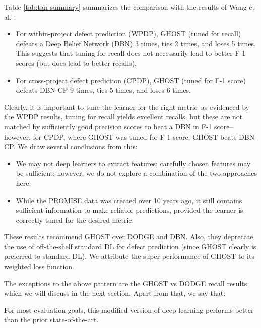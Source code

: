 \documentclass[10pt,compsoc,twocolumn]{IEEEtran}
\newcommand{\bi}{\begin{itemize}}
\newcommand{\ei}{\end{itemize}}
\begin{document}
Table \ref{tab:tan-summary} summarizes the comparison with the results of Wang et al. \cite{wang2016automatically}.
\bi
    \item For within-project defect prediction (WPDP), GHOST (tuned for recall) defeats a Deep Belief Network (DBN) 3 times, ties 2 times, and loses 5 times. This suggests that tuning for recall does not necessarily lead to better F-1 scores (but does lead to better recalls).
    \item For cross-project defect prediction (CPDP), GHOST (tuned for F-1 score) defeats DBN-CP 9 times, ties 5 times, and loses 6 times.
\ei

Clearly, it is important to tune the learner for the right metric--as evidenced by the WPDP results, tuning for recall yields excellent recalls, but these are not matched by sufficiently good precision scores to beat a DBN in F-1 score--however, for CPDP, where GHOST was tuned for F-1 score, GHOST beats DBN-CP. We draw several conclusions from this:
\bi
    \item We may not deep learners to extract features; carefully chosen features may be sufficient; however, we do not explore a combination of the two approaches here.
    \item While the PROMISE data was created over 10 years ago, it still contains sufficient information to make reliable predictions, provided the learner is correctly tuned for the desired metric.
\ei

These results recommend GHOST over DODGE and DBN. Also, they 
 deprecate the use of off-the-shelf standard DL for defect prediction (since GHOST clearly is preferred to standard DL). We attribute the super performance of GHOST to its weighted loss function.

The exceptions to the above pattern are the  GHOST vs DODGE recall results, which we will discuss in the next section.
Apart from that, we say that:

\begin{blockquote}
    \noindent
    For most evaluation goals, this modified version of deep learning performs better than the prior state-of-the-art.
\end{blockquote}

 
 
\end{document}
